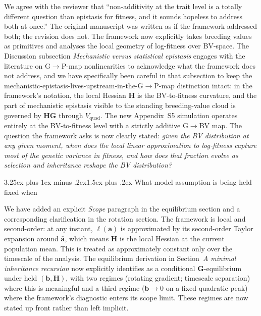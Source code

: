 \documentclass[11pt,a4paper]{article}
\makeatletter
\renewcommand{\subsubsection}{\@startsection{subsubsection}{3}{0pt}%
  {3.25ex plus 1ex minus .2ex}{1.5ex plus .2ex}%
  {\normalsize\bfseries\itshape}}
\newcommand{\Vquad}{\ensuremath{V_{\mathrm{quad}}}\xspace}
\newcommand{\mat}[1]{\ensuremath{\mathbf{#1}}}
\newcommand{\vect}[1]{\ensuremath{\bm{#1}}}
\makeatother
\begin{document}
We agree with the reviewer that ``non-additivity at the trait level is a totally different question than epistasis for fitness, and it sounds hopeless to address both at once.'' The original manuscript was written as if the framework addressed both; the revision does not. The framework now explicitly takes breeding values as primitives and analyses the local geometry of log-fitness over BV-space. The Discussion subsection \textit{Mechanistic versus statistical epistasis} engages with the literature on G$\to$P-map nonlinearities to acknowledge what the framework does not address, and we have specifically been careful in that subsection to keep the mechanistic-epistasis-lives-upstream-in-the-G$\to$P-map distinction intact: in the framework's notation, the local Hessian $\mat{H}$ is the BV-to-fitness curvature, and the part of mechanistic epistasis visible to the standing breeding-value cloud is governed by $\mat{H}\mat{G}$ through $\Vquad$. The new Appendix~S5 simulation operates entirely at the BV-to-fitness level with a strictly additive G$\to$BV map. The question the framework asks is now clearly stated: \textit{given the BV distribution at any given moment, when does the local linear approximation to log-fitness capture most of the genetic variance in fitness, and how does that fraction evolve as selection and inheritance reshape the BV distribution?}

\subsubsection{What model assumption is being held fixed when}

We have added an explicit \textit{Scope} paragraph in the equilibrium section and a corresponding clarification in the rotation section. The framework is local and second-order: at any instant, $\ell(\vect{a})$ is approximated by its second-order Taylor expansion around $\bar{\vect{a}}$, which means $\mat{H}$ is the local Hessian at the current population mean. This is treated as approximately constant only over the timescale of the analysis. The equilibrium derivation in Section~\textit{A minimal inheritance recursion} now explicitly identifies as a conditional $\mat{G}$-equilibrium under held $(\vect{b}, \mat{H})$, with two regimes (rotating gradient; timescale separation) where this is meaningful and a third regime ($\vect{b} \to 0$ on a fixed quadratic peak) where the framework's diagnostic enters its scope limit. These regimes are now stated up front rather than left implicit.
\end{document}
